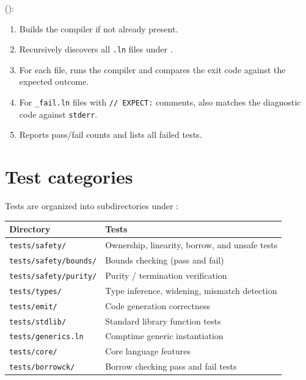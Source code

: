 \pnum
{} ():
\begin{enumerate}
\item Builds the compiler if not already present.
\item Recursively discovers all \texttt{.ln} files under .
\item For each file, runs the compiler and compares the exit code against the
  expected outcome.
\item For \texttt{\_fail.ln} files with \texttt{// EXPECT:} comments, also
  matches the diagnostic code against \texttt{stderr}.
\item Reports pass/fail counts and lists all failed tests.
\end{enumerate}

\section{Test categories}
\label{sec:test-categories}

\pnum
Tests are organized into subdirectories under :

\begin{center}
\begin{tabular}{ll}
\toprule
\textbf{Directory} & \textbf{Tests} \\
\midrule
\texttt{tests/safety/}     & Ownership, linearity, borrow, and unsafe tests \\
\texttt{tests/safety/bounds/} & Bounds checking (pass and fail) \\
\texttt{tests/safety/purity/} & Purity / termination verification \\
\texttt{tests/types/}      & Type inference, widening, mismatch detection \\
\texttt{tests/emit/}       & Code generation correctness \\
\texttt{tests/stdlib/}     & Standard library function tests \\
\texttt{tests/generics.ln} & Comptime generic instantiation \\
\texttt{tests/core/}       & Core language features \\
\texttt{tests/borrowck/}   & Borrow checking pass and fail tests \\
\bottomrule
\end{tabular}
\end{center}

